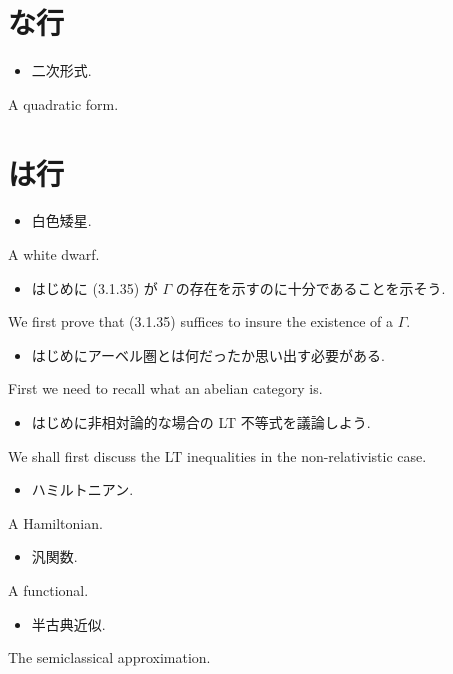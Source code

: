 \documentclass[openany, a4paper, oneside]{jsbook}
\begin{document}
\section{な行}

\begin{itemize}
\item 二次形式.
\end{itemize}
A quadratic form.
\section{は行}

\begin{itemize}
\item 白色矮星. \cite{LiebSeiringer1}
\end{itemize}
A white dwarf.

\begin{itemize}
\item はじめに (3.1.35) が $\Gamma$ の存在を示すのに十分であることを示そう. \cite{LiebSeiringer1}
\end{itemize}
We first prove that (3.1.35) suffices to insure the existence of a $\Gamma$.

\begin{itemize}
\item はじめにアーベル圏とは何だったか思い出す必要がある. \cite{CharlesWeibel1}
\end{itemize}
First we need to recall what an abelian category is.

\begin{itemize}
\item はじめに非相対論的な場合の LT 不等式を議論しよう. \cite{LiebSeiringer1}
\end{itemize}
We shall first discuss the LT inequalities in the non-relativistic case.

\begin{itemize}
\item ハミルトニアン.
\end{itemize}
A Hamiltonian.

\begin{itemize}
\item 汎関数. \cite{LiebSeiringer1}
\end{itemize}
A functional.

\begin{itemize}
\item 半古典近似. \cite{LiebSeiringer1}
\end{itemize}
The semiclassical approximation.
\end{document}
